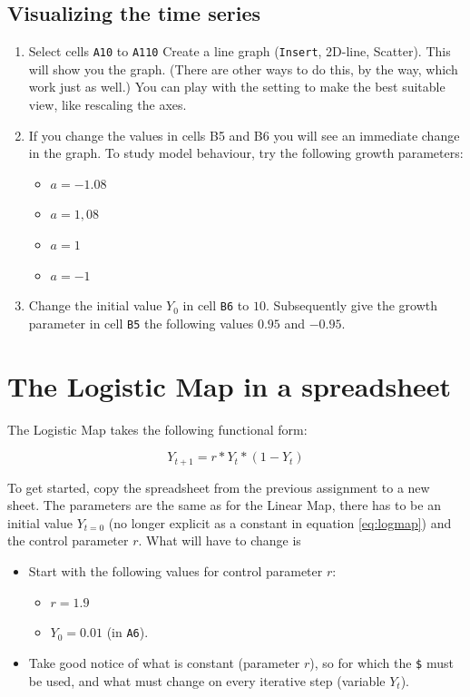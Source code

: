 \documentclass[]{book}
\providecommand{\tightlist}{%
  \setlength{\itemsep}{0pt}\setlength{\parskip}{0pt}}
\let\stdsection\section
\renewcommand\section{\newpage\stdsection}
\begin{document}
\subsection{Visualizing the time
series}\label{visualizing-the-time-series}

\begin{enumerate}
\item
  Select cells \texttt{A10} to \texttt{A110} Create a line graph
  (\texttt{Insert}, 2D-line, Scatter). This will show you the graph.
  (There are other ways to do this, by the way, which work just as
  well.) You can play with the setting to make the best suitable view,
  like rescaling the axes.
\item
  If you change the values in cells B5 and B6 you will see an immediate
  change in the graph. To study model behaviour, try the following
  growth parameters:

  \begin{itemize}
  \tightlist
  \item
    \(a = -1.08\)
  \item
    \(a = 1,08\)
  \item
    \(a = 1\)
  \item
    \(a = -1\)
  \end{itemize}
\item
  Change the initial value \(Y_0\) in cell \texttt{B6} to \(10\).
  Subsequently give the growth parameter in cell \texttt{B5} the
  following values \(0.95\) and \(-0.95\).
\end{enumerate}

\section{The Logistic Map in a
spreadsheet}\label{the-logistic-map-in-a-spreadsheet}

The Logistic Map takes the following functional form:

\begin{equation}
Y_{t+1} = r*Y_t*(1-Y_t)
\label{eq:logmap}
\end{equation}

To get started, copy the spreadsheet from the previous assignment to a
new sheet. The parameters are the same as for the Linear Map, there has
to be an initial value \(Y_{t=0}\) (no longer explicit as a constant in
equation \eqref{eq:logmap}) and the control parameter \(r\). What will
have to change is

\begin{itemize}
\tightlist
\item
  Start with the following values for control parameter \(r\):

  \begin{itemize}
  \tightlist
  \item
    \(r = 1.9\)
  \item
    \(Y_0 = 0.01\) (in \texttt{A6}).
  \end{itemize}
\item
  Take good notice of what is constant (parameter \(r\)), so for which
  the \texttt{\$} must be used, and what must change on every iterative
  step (variable \(Y_t\)).
\end{itemize}
\end{document}
